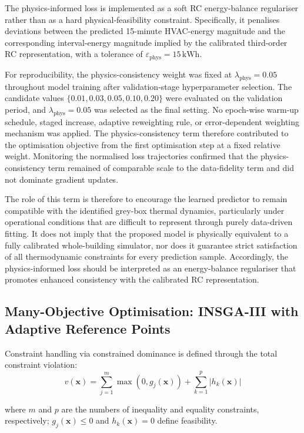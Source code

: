 \documentclass[11pt]{article}
\providecommand{\kWh}{\,\text{kWh}}
\begin{document}
The physics-informed loss is implemented as a soft RC energy-balance regulariser rather than as a hard physical-feasibility constraint. Specifically, it penalises deviations between the predicted 15-minute HVAC-energy magnitude and the corresponding interval-energy magnitude implied by the calibrated third-order RC representation, with a tolerance of $\varepsilon_{\mathrm{phys}}=15\kWh$.

For reproducibility, the physics-consistency weight was fixed at $\lambda_{\mathrm{phys}}=0.05$ throughout model training after validation-stage hyperparameter selection. The candidate values $\{0.01,0.03,0.05,0.10,0.20\}$ were evaluated on the validation period, and $\lambda_{\mathrm{phys}}=0.05$ was selected as the final setting. No epoch-wise warm-up schedule, staged increase, adaptive reweighting rule, or error-dependent weighting mechanism was applied. The physics-consistency term therefore contributed to the optimisation objective from the first optimisation step at a fixed relative weight. Monitoring the normalised loss trajectories confirmed that the physics-consistency term remained of comparable scale to the data-fidelity term and did not dominate gradient updates.

The role of this term is therefore to encourage the learned predictor to remain compatible with the identified grey-box thermal dynamics, particularly under operational conditions that are difficult to represent through purely data-driven fitting. It does not imply that the proposed model is physically equivalent to a fully calibrated whole-building simulator, nor does it guarantee strict satisfaction of all thermodynamic constraints for every prediction sample. Accordingly, the physics-informed loss should be interpreted as an energy-balance regulariser that promotes enhanced consistency with the calibrated RC representation.

\subsection{Many-Objective Optimisation: INSGA-III with Adaptive Reference Points}

Constraint handling via constrained dominance is defined through the total constraint violation:
\begin{equation}
v(\mathbf{x}) = \sum_{j=1}^{m} \max(0, g_j(\mathbf{x})) + \sum_{k=1}^{p} |h_k(\mathbf{x})|
\end{equation}

where $m$ and $p$ are the numbers of inequality and equality constraints, respectively; $g_j(\mathbf{x})\le0$ and $h_k(\mathbf{x})=0$ define feasibility.
\end{document}
